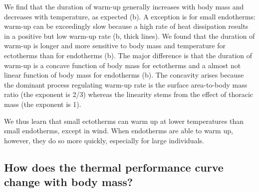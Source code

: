 We find that the duration of warm-up generally increases with body mass and decreases with temperature, as expected (b).
A exception is for small endotherms: warm-up can be exceedingly slow because a high rate of heat dissipation results in a positive but low warm-up rate (b, thick lines).  %
We found that the duration of warm-up is longer and more sensitive to body mass and temperature for ectotherms than for endotherms (b). %
The major difference is that the duration of warm-up is a concave function of body mass for ectotherms and a almost not linear function of body mass for endotherms (b).
The concavity arises because the dominant process regulating warm-up rate is the surface area-to-body mass ratio (the exponent is 2/3) whereas the linearity stems from the effect of thoracic mass (the exponent is 1).


We thus learn that small ectotherms can warm up at lower temperatures than small endotherms, except in wind.
When endotherms are able to warm up, however, they do so more quickly, especially for large individuals.


\subsection*{How does the thermal performance curve change with body mass?}

